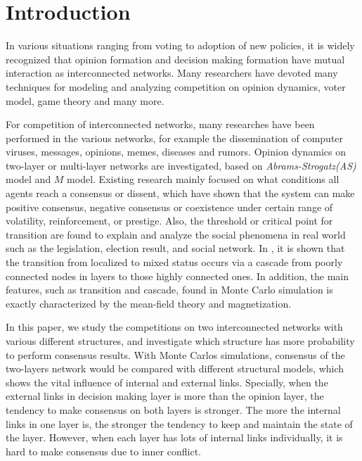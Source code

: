 \documentclass[english]{cccconf}
\begin{document}
\section{Introduction}
In various situations ranging from voting to adoption of new policies, it is widely recognized that opinion formation and decision making formation have mutual interaction as interconnected networks\cite{bianconi2018,domenico2013,tomasini2015, kimsangwoo2012,newman2010,boccaletti2014,mikko2013,huberman2004}. Many researchers have devoted many techniques for modeling and analyzing competition on opinion dynamics\cite{amato2017,quattrociocchi2014,haibo2017, hua2014}, voter model\cite{redner2017}, game theory\cite{smyrnakis2019} and many more\cite{danziger2019,namkhanhvu2017,laguna2004,masuda2015,zuev2012, shenyu2018, zhou2018}.  
 
For competition of interconnected networks, many researches have been performed in the various networks, for example the dissemination of computer viruses, messages, opinions, memes, diseases and rumors\cite{hua2014,shenyu2018, zhou2018, alvarez2016,gomez2015,diep2017,rocca2014,velasquez2018}. Opinion dynamics on two-layer or multi-layer networks are investigated, based on \textit{Abrams-Strogatz(AS)} model\cite{abrams2003,vazquez2010} and $M$ model\cite{rocca2014}. Existing research mainly focused on what conditions all agents reach a consensus or dissent, which have shown that the system can make positive consensus, negative consensus or coexistence under certain range of volatility, reinforcement, or prestige. Also, the threshold or critical point for transition are found to explain and analyze the social phenomena in real world such as the legislation, election result, and social network\cite{alvarez2016, amato2017, diep2017}. In \cite{gomez2015}, it is shown that the transition from localized to mixed status occurs via a cascade from poorly connected nodes in layers to those highly connected ones. In addition, the main features, such as transition and cascade, found in Monte Carlo simulation is exactly characterized by the mean-field theory and magnetization\cite{alvarez2016, diep2017, amato2017, gomez2015}.   

In this paper, we study the competitions on two interconnected networks with various different structures, and investigate which structure has more probability to perform consensus results. With Monte Carlos simulations, consensus of the two-layers network would be compared with different structural models, which shows the vital influence of internal and external links. Specially, when the external links in decision making layer is more than the opinion layer, the tendency to make consensus on both layers is stronger. The more the internal links in one layer is, the stronger the tendency to keep and maintain the state of the layer. However, when each layer has lots of internal links individually, it is hard to make consensus due to inner conflict.    
\end{document}
